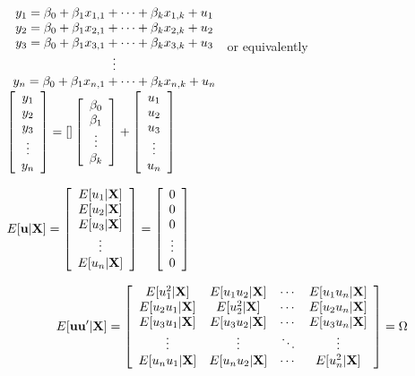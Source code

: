 \documentclass{article}%
\begin{document}
$%
\begin{array}
[c]{c}%
y_{1}=\beta_{0}+\beta_{1}x_{1,1}+\cdots+\beta_{k}x_{1,k}+u_{1}\\
y_{2}=\beta_{0}+\beta_{1}x_{2,1}+\cdots+\beta_{k}x_{2,k}+u_{2}\\
y_{3}=\beta_{0}+\beta_{1}x_{3,1}+\cdots+\beta_{k}x_{3,k}+u_{3}\\
\vdots\\
y_{n}=\beta_{0}+\beta_{1}x_{n,1}+\cdots+\beta_{k}x_{n,k}+u_{n}%
\end{array}
$ or equivalently $\left[
\begin{array}
[c]{c}%
y_{1}\\
y_{2}\\
y_{3}\\
\vdots\\
y_{n}%
\end{array}
\right]  =\left[  {}\right]  \left[
\begin{array}
[c]{c}%
\beta_{0}\\
\beta_{1}\\
\vdots\\
\beta_{k}%
\end{array}
\right]  +\left[
\begin{array}
[c]{c}%
u_{1}\\
u_{2}\\
u_{3}\\
\vdots\\
u_{n}%
\end{array}
\right]  $

\bigskip

$E[\mathbf{u}|\mathbf{X}]=\left[
\begin{array}
[c]{c}%
E[u_{1}|\mathbf{X}]\\
E[u_{2}|\mathbf{X}]\\
E[u_{3}|\mathbf{X}]\\
\vdots\\
E[u_{n}|\mathbf{X}]
\end{array}
\right]  =\left[
\begin{array}
[c]{c}%
0\\
0\\
0\\
\vdots\\
0
\end{array}
\right]  $

$$E[\mathbf{u}\mathbf{u}^{\prime}|\mathbf{X}]=\left[
\begin{array}
[c]{cccc}%
E[u_{1}^{2}|\mathbf{X}] & E[u_{1}u_{2}|\mathbf{X}] & \cdots & E[u_{1}%
u_{n}|\mathbf{X}]\\
E[u_{2}u_{1}|\mathbf{X}] & E[u_{2}^{2}|\mathbf{X}] & \cdots & E[u_{2}%
u_{n}|\mathbf{X}]\\
E[u_{3}u_{1}|\mathbf{X}] & E[u_{3}u_{2}|\mathbf{X}] & \cdots & E[u_{3}%
u_{n}|\mathbf{X}]\\
\vdots & \vdots & \ddots & \vdots\\
E[u_{n}u_{1}|\mathbf{X}] & E[u_{n}u_{2}|\mathbf{X}] & \cdots & E[u_{n}%
^{2}|\mathbf{X}]
\end{array}
\right]  =\Omega$$
\end{document}
